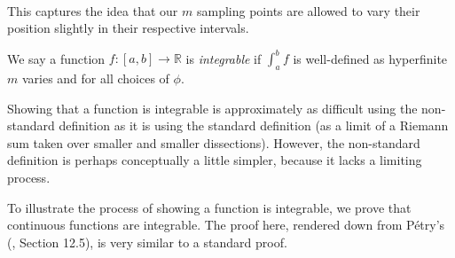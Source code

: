 \documentclass[11pt]{amsart}
\theoremstyle{remark}
\begin{document}
\

This captures the idea that our $m$ sampling points are allowed to vary their position slightly in their respective intervals.

We say a function $f: [a, b] \to \mathbb{R}$ is \emph{integrable} if $\int_a^b f$ is well-defined as hyperfinite $m$ varies and for all choices of $\phi$.

Showing that a function is integrable is approximately as difficult using the non-standard definition as it is using the standard definition (as a limit of a Riemann sum taken over smaller and smaller dissections).
However, the non-standard definition is perhaps conceptually a little simpler, because it lacks a limiting process.

To illustrate the process of showing a function is integrable, we prove that continuous functions are integrable.
The proof here, rendered down from P\'{e}try's (\cite{petry}, Section 12.5), is very similar to a standard proof.

\
\end{document}
